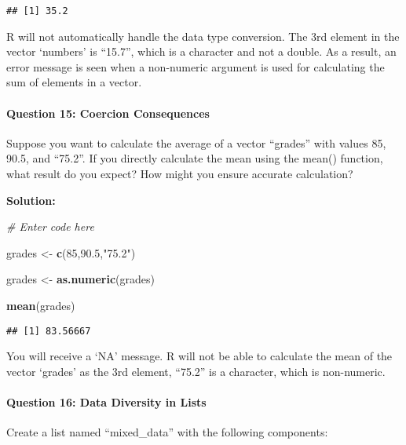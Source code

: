 \documentclass[
]{article}
\newenvironment{Shaded}{\begin{snugshade}}{\end{snugshade}}
\newcommand{\CommentTok}[1]{\textcolor[rgb]{0.56,0.35,0.01}{\textit{#1}}}
\newcommand{\DecValTok}[1]{\textcolor[rgb]{0.00,0.00,0.81}{#1}}
\newcommand{\FloatTok}[1]{\textcolor[rgb]{0.00,0.00,0.81}{#1}}
\newcommand{\FunctionTok}[1]{\textcolor[rgb]{0.13,0.29,0.53}{\textbf{#1}}}
\newcommand{\NormalTok}[1]{#1}
\newcommand{\OtherTok}[1]{\textcolor[rgb]{0.56,0.35,0.01}{#1}}
\newcommand{\StringTok}[1]{\textcolor[rgb]{0.31,0.60,0.02}{#1}}
\begin{document}
\begin{verbatim}
## [1] 35.2
\end{verbatim}

R will not automatically handle the data type conversion. The 3rd
element in the vector `numbers' is ``15.7'', which is a character and
not a double. As a result, an error message is seen when a non-numeric
argument is used for calculating the sum of elements in a vector.

\hypertarget{question-15-coercion-consequences}{%
\paragraph{Question 15: Coercion
Consequences}\label{question-15-coercion-consequences}}

Suppose you want to calculate the average of a vector ``grades'' with
values 85, 90.5, and ``75.2''. If you directly calculate the mean using
the mean() function, what result do you expect? How might you ensure
accurate calculation?

\textbf{Solution:}

\begin{Shaded}
\begin{Highlighting}[]
\CommentTok{\# Enter code here}

\NormalTok{grades }\OtherTok{\textless{}{-}} \FunctionTok{c}\NormalTok{(}\DecValTok{85}\NormalTok{,}\FloatTok{90.5}\NormalTok{,}\StringTok{"75.2"}\NormalTok{)}

\NormalTok{grades }\OtherTok{\textless{}{-}} \FunctionTok{as.numeric}\NormalTok{(grades)}

\FunctionTok{mean}\NormalTok{(grades)}
\end{Highlighting}
\end{Shaded}

\begin{verbatim}
## [1] 83.56667
\end{verbatim}

You will receive a `NA' message. R will not be able to calculate the
mean of the vector `grades' as the 3rd element, ``75.2'' is a character,
which is non-numeric.

\hypertarget{question-16-data-diversity-in-lists}{%
\paragraph{Question 16: Data Diversity in
Lists}\label{question-16-data-diversity-in-lists}}

Create a list named ``mixed\_data'' with the following components:
\end{document}

